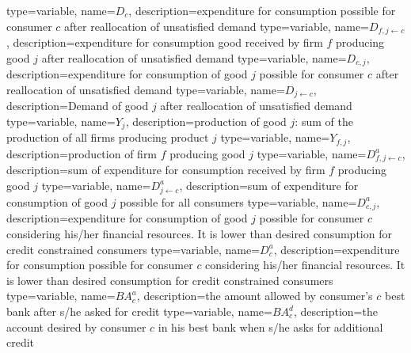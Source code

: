 {%
  type=variable,%
  name={$D_{c}$},%
  description={expenditure for consumption possible for consumer $c$ after reallocation of unsatisfied demand} 
}
{%
  type=variable,%
  name={$D_{f,j\leftarrow c}$},%
  description={expenditure for consumption good received by firm $f$ producing good $j$ after reallocation of unsatisfied demand} 
}
{%
  type=variable,%
  name={$D_{c,j}$},%
  description={expenditure for consumption of good $j$ possible for consumer $c$ after reallocation of unsatisfied demand} 
}
{%
  type=variable,%
  name={$D_{j\leftarrow c}$},%
  description={Demand of good $j$ after reallocation of unsatisfied demand} 
}
{%
  type=variable,%
  name={$Y_{j}$},%
  description={production of good $j$: sum of the production of all firms producing product $j$} 
}
{%
  type=variable,%
  name={$Y_{f,j}$},%
  description={production of firm $f$ producing good $j$} 
}
{%
  type=variable,%
  name={$D^a_{f,j\leftarrow c}$},%
  description={sum of expenditure for consumption received by firm $f$ producing good $j$} 
}
{%
  type=variable,%
  name={$D^a_{j\leftarrow c}$},%
  description={sum of expenditure for consumption of good $j$ possible for all consumers} 
}
{%
  type=variable,%
  name={$D^a_{c,j}$},%
  description={expenditure for consumption of good $j$ possible for consumer $c$ considering his/her financial resources. It is lower than desired consumption for credit constrained consumers} 
}
{%
  type=variable,%
  name={$D^a_{c}$},%
  description={expenditure for consumption possible for consumer $c$ considering his/her financial resources. It is lower than desired consumption for credit constrained consumers} 
}
{%
  type=variable,%
  name={$BA^a_{c}$},%
  description={the amount allowed by consumer's $c$ best bank after s/he asked for credit} 
}
{%
  type=variable,%
  name={$BA^d_{c}$},%
  description={the account desired by consumer $c$ in his best bank when s/he asks for additional credit} 
}
